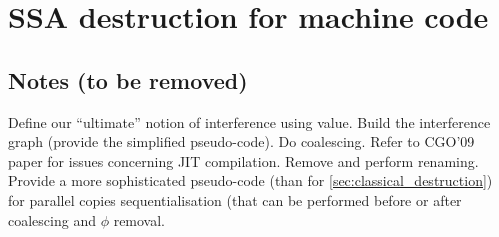\chapter{SSA destruction for machine code }
\graphicspath{{figs/}{part1/alternative_ssa_destruction_algorithm/figs/}{../part1/alternative_ssa_destruction_algorithm/figs/}}

\label{chap:alternative_ssa_destruction_algorithm}








\section{Notes (to be removed)}

Define our ``ultimate'' notion of interference using value. Build the interference graph (provide the simplified pseudo-code). Do coalescing. Refer to CGO'09 paper for issues concerning JIT compilation. Remove \phifuns and perform renaming. Provide a more sophisticated pseudo-code (than for \ref{sec:classical_destruction}) for parallel copies sequentialisation (that can be performed before or after coalescing and $\phi$ removal.




